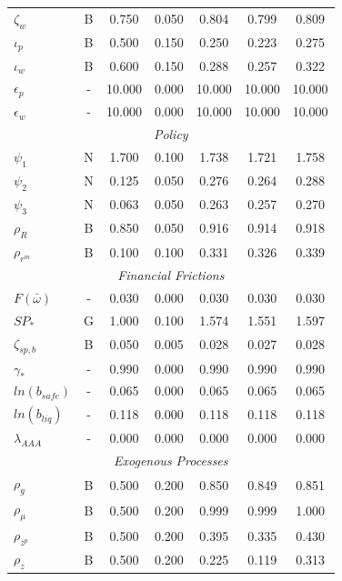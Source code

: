 \documentclass[12pt]{article}
\begin{document}
{\begin{longtable}{lcccccc}
$\zeta_w$ & B &    0.750 &    0.050 &    0.804 &    0.799 &    0.809 \\
$\iota_p$ & B &    0.500 &    0.150 &    0.250 &    0.223 &    0.275 \\
$\iota_w$ & B &    0.600 &    0.150 &    0.288 &    0.257 &    0.322 \\
$\epsilon_{p}$ & - &   10.000 &    0.000 &   10.000 &   10.000 &   10.000 \\
$\epsilon_{w}$ & - &   10.000 &    0.000 &   10.000 &   10.000 &   10.000 \\
\multicolumn{7}{c}{\textit{Policy}} \\[3pt]
$\psi_1$ & N &    1.700 &    0.100 &    1.738 &    1.721 &    1.758 \\
$\psi_2$ & N &    0.125 &    0.050 &    0.276 &    0.264 &    0.288 \\
$\psi_3$ & N &    0.063 &    0.050 &    0.263 &    0.257 &    0.270 \\
$\rho_R$ & B &    0.850 &    0.050 &    0.916 &    0.914 &    0.918 \\
$\rho_{r^m}$ & B &    0.100 &    0.100 &    0.331 &    0.326 &    0.339 \\
\multicolumn{7}{c}{\textit{Financial Frictions}} \\[3pt]
$F(\bar{\omega})$ & - &    0.030 &    0.000 &    0.030 &    0.030 &    0.030 \\
$SP_*$ & G &    1.000 &    0.100 &    1.574 &    1.551 &    1.597 \\
$\zeta_{sp,b}$ & B &    0.050 &    0.005 &    0.028 &    0.027 &    0.028 \\
$\gamma_*$ & - &    0.990 &    0.000 &    0.990 &    0.990 &    0.990 \\
$ln(b_{safe})$ & - &    0.065 &    0.000 &    0.065 &    0.065 &    0.065 \\
$ln(b_{liq})$ & - &    0.118 &    0.000 &    0.118 &    0.118 &    0.118 \\
$\lambda_{AAA}$ & - &    0.000 &    0.000 &    0.000 &    0.000 &    0.000 \\
\multicolumn{7}{c}{\textit{Exogenous Processes}} \\[3pt]
$\rho_g$ & B &    0.500 &    0.200 &    0.850 &    0.849 &    0.851 \\
$\rho_{\mu}$ & B &    0.500 &    0.200 &    0.999 &    0.999 &    1.000 \\
$\rho_{z^p}$ & B &    0.500 &    0.200 &    0.395 &    0.335 &    0.430 \\
$\rho_z$ & B &    0.500 &    0.200 &    0.225 &    0.119 &    0.313 \\

\end{longtable}}
\end{document}
